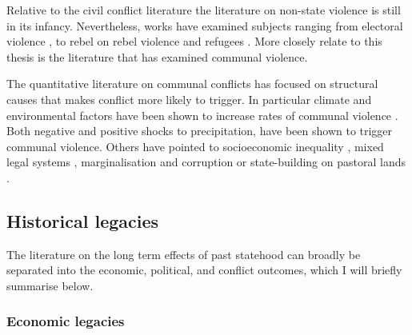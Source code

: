 \documentclass[12pt]{article}
\begin{document}
Relative to the civil conflict literature the literature on non-state violence
is still in its infancy. Nevertheless, works have examined subjects ranging from
electoral violence \citep{Fjelde_2020, Salehyan_2014, Burchard_2015}, to rebel
on rebel violence \citep{Fjelde_2012, Lilja_2011, Cunningham_2012, Nygard_2014}
and refugees \citep{Bohmelt_2018}. More closely relate to this thesis is the
literature that has examined communal violence.

The quantitative literature on communal conflicts has focused on structural
causes that makes conflict more likely to trigger. In particular climate and
environmental factors have been shown to increase rates of communal violence
\citep{Turner_2011}. Both negative \citep{Detges_2017, Fjelde2012,
van_Weezel_2019, Petrova_2022} and positive \citep{Theisen2012, Witsenburg2012}
shocks to precipitation, have been shown to trigger communal violence. Others
have pointed to socioeconomic inequality \citep{Fjelde2014, PETERS_2004}, mixed
legal systems \citep{Eck2014}, marginalisation and corruption
\citep{BENJAMINSEN_2009} or state-building on pastoral lands
\citep{hagmann2008pastoral}.

\subsection{Historical legacies} \label{Historical legacies}

The literature on the long term effects of past statehood can broadly be
separated into the economic, political, and conflict outcomes, which I will
briefly summarise below.

\subsubsection{Economic legacies} \label{Economic legacies}
\end{document}
